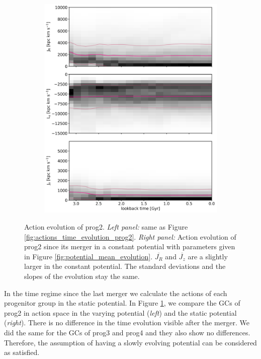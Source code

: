 \begin{figure}[htbp]
\begin{subfigure}[c]{0.48\textwidth}
	    \includegraphics[width=\textwidth]{plots/Dynamics/prog2/action_wodisk_time_evolution_hist_mean_static_pot.png}
    \end{subfigure}
    \caption{Action evolution of prog2. \textit{Left panel:} same as Figure \ref{fig:actions_time_evolution_prog2}. \textit{Right panel:} Action evolution of prog2 since its merger in a constant potential with parameters given in Figure \ref{fig:potential_mean_evolution}. $\overline{J_R}$ and $\overline{J_z}$ are a slightly larger in the constant potential. The standard deviations and the slopes of the evolution stay the same.}\label{fig:comparison_actions_time_evolution_mean_pot_prog2}
\end{figure}
In the time regime since the last merger we calculate the actions of each progenitor group in the static potential. In Figure \ref{fig:comparison_actions_time_evolution_mean_pot_prog2}, we compare the \acp{GC} of prog2 in action space in the varying potential (\textit{left}) and the static potential (\textit{right}). There is no difference in the time evolution visible after the merger. We did the same for the \acp{GC} of prog3 and prog4 and they also show no differences. Therefore, the assumption of having a slowly evolving potential can be considered as satisfied.
